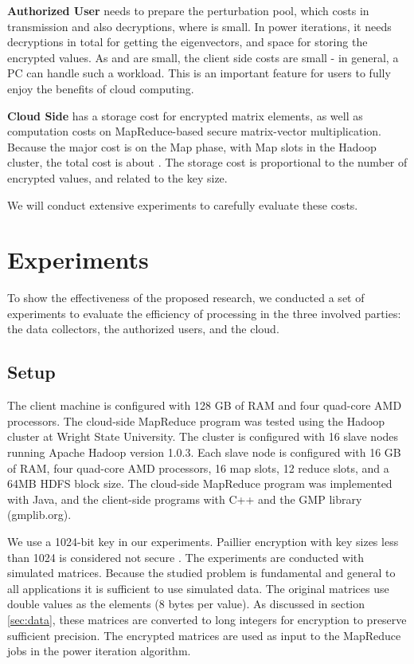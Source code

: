 \documentclass[10pt, conference, compsocconf]{IEEEtran}
\begin{document}
\textbf{Authorized User} needs to prepare the perturbation pool, which costs  in transmission and also  decryptions, where  is small. In power iterations, it needs  decryptions in total for getting the  eigenvectors, and  space for storing the encrypted values. As  and  are small, the client side costs are small - in general, a PC can handle such a workload. This is an important feature for users to fully enjoy the benefits of cloud computing.
 


\textbf{Cloud Side} has a  storage cost for encrypted matrix elements, as well as computation costs on MapReduce-based secure matrix-vector multiplication. Because the major cost is on the Map phase, with  Map slots in the Hadoop cluster, the total cost is about . The storage cost is proportional to the number of encrypted values, and related to the key size. 

We will conduct extensive experiments to carefully evaluate these costs.  


\section{Experiments}\label{sec:exp}


To show the effectiveness of the proposed research, we conducted a set of experiments to evaluate the efficiency of processing in the three involved parties: the data collectors, the authorized users, and the cloud.   


\subsection{Setup}
The client machine is configured with 128 GB of RAM and four quad-core AMD processors. The cloud-side MapReduce program was tested using the Hadoop cluster at Wright State University. The cluster is configured with 16 slave nodes running Apache Hadoop version 1.0.3. Each slave node is configured with 16 GB of RAM, four quad-core AMD processors, 16 map slots, 12 reduce slots, and a 64MB HDFS block size.  The cloud-side MapReduce program was implemented with Java, and the client-side programs with C++ and the GMP library (gmplib.org). 


We use a 1024-bit key in our experiments. Paillier encryption with key sizes less than 1024 is considered not secure \cite{lenstra01}. 
The experiments are conducted with simulated matrices. Because the studied problem is fundamental and general to all applications it is sufficient to use simulated data. The original matrices use double values as the elements (8 bytes per value). As discussed in section \ref{sec:data}, these matrices are converted to long integers for encryption to preserve sufficient precision. The encrypted matrices are used as input to the MapReduce jobs in the power iteration algorithm. 
\end{document}
